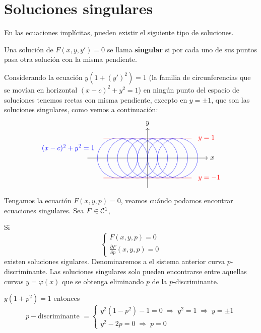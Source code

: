 \section{Soluciones singulares}
En las ecuaciones implícitas, pueden existir el siguiente tipo de soluciones.
\begin{defi}
    Una solución de $F(x,y,y')=0$ se llama \textbf{singular} si por cada uno de sus puntos pasa otra solución con la misma pendiente. 
\end{defi}
\begin{eje}
    Considerando la ecuación $y(1+(y')^2)=1$ (la familia de circunferencias que se movían en horizontal $(x-c)^2+y^2=1$) en ningún punto del espacio de soluciones tenemos rectas con misma pendiente, excepto en $y=\pm 1$, que son las soluciones singulares, como vemos a continuación:
$$
\begin{tikzpicture}[scale=1]
  \foreach \c in {-1.5,-1,...,1.5} {
    \draw[blue] plot[domain=0:2*pi, samples=100] ({\c + cos(\x r)}, {sin(\x r)});
  }
  \draw[red, domain=-2.2:2.2, smooth, samples=100] plot (\x, 1);
  \draw[red, domain=-2.2:2.2, smooth, samples=100] plot (\x, -1);
  \draw[->] (-3,0) -- (3,0) node[right] {$x$};
  \draw[->] (0,-1.5) -- (0,1.5) node[above] {$y$};
  \draw (-5.4,0.5) node[right,blue] {$(x-c)^2+y^2=1$};
  \draw (2.4,1) node[right,red] {$y=1$};
  \draw (2.4,-1) node[right,red] {$y=-1$};
\end{tikzpicture}$$
\end{eje}
Tengamos la ecuación $F(x,y,p)=0$, veamos cuándo podamos encontrar ecuaciones singulares. Sea $F \in \mathcal{C}^1$,
\begin{prop}
    Si 
    $$\left\{\begin{array}{l}
         F(x,y,p)=0  \\
         \frac{\partial F}{\partial p}(x,y,p)=0
    \end{array} \right.$$ existen soluciones sigulares. Denominaremos a el sistema anterior curva $p$-discriminante. Las soluciones singulares solo pueden encontrarse entre aquellas curvas $y=\varphi(x)$ que se obtenga eliminando $p$ de la $p$-discriminante. 
\end{prop}
\begin{eje}
    $y(1+p^2)=1$ entonces
    $$p-\text{discriminante } = \left\{ \begin{array}{l}
         y^2(1-p^2)-1=0 \; \Rightarrow \; y^2=1 \; \Rightarrow \; y=\pm 1   \\
         y^2-2p=0 \; \Rightarrow \; p=0
    \end{array}\right.$$
\end{eje}
